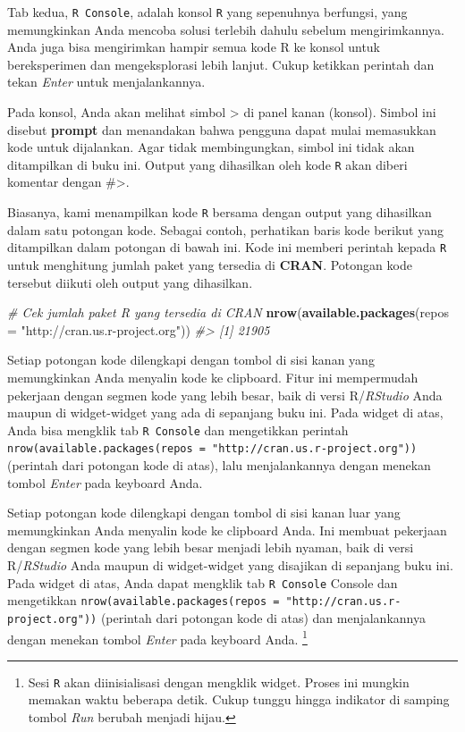 \documentclass[
  oneside]{book}
\newenvironment{Shaded}{\begin{snugshade}}{\end{snugshade}}
\newcommand{\AttributeTok}[1]{\textcolor[rgb]{0.13,0.29,0.53}{#1}}
\newcommand{\CommentTok}[1]{\textcolor[rgb]{0.56,0.35,0.01}{\textit{#1}}}
\newcommand{\FunctionTok}[1]{\textcolor[rgb]{0.13,0.29,0.53}{\textbf{#1}}}
\newcommand{\NormalTok}[1]{#1}
\newcommand{\StringTok}[1]{\textcolor[rgb]{0.31,0.60,0.02}{#1}}
\begin{document}
Tab kedua, \texttt{R Console}, adalah konsol \texttt{R} yang
sepenuhnya berfungsi, yang memungkinkan Anda mencoba solusi terlebih
dahulu sebelum mengirimkannya. Anda juga bisa mengirimkan hampir semua
kode R ke konsol untuk bereksperimen dan mengeksplorasi lebih lanjut.
Cukup ketikkan perintah dan tekan \emph{Enter} untuk menjalankannya.

Pada konsol, Anda akan melihat simbol \textgreater{} di panel kanan
(konsol). Simbol ini disebut \textbf{prompt} dan menandakan bahwa pengguna
dapat mulai memasukkan kode untuk dijalankan. Agar tidak membingungkan,
simbol ini tidak akan ditampilkan di buku ini. Output yang dihasilkan
oleh kode \texttt{R} akan diberi komentar dengan \#\textgreater{}.

Biasanya, kami menampilkan kode \texttt{R} bersama dengan output
yang dihasilkan dalam satu potongan kode. Sebagai contoh, perhatikan
baris kode berikut yang ditampilkan dalam potongan di bawah ini. Kode
ini memberi perintah kepada \texttt{R} untuk menghitung jumlah
paket yang tersedia di \textbf{CRAN}. Potongan kode tersebut diikuti oleh
output yang dihasilkan.

\begin{Shaded}
\begin{Highlighting}[]
\CommentTok{\# Cek jumlah paket R yang tersedia di CRAN}
\FunctionTok{nrow}\NormalTok{(}\FunctionTok{available.packages}\NormalTok{(}\AttributeTok{repos =} \StringTok{"http://cran.us.r{-}project.org"}\NormalTok{))}
\CommentTok{\#\textgreater{} [1] 21905}
\end{Highlighting}
\end{Shaded}

Setiap potongan kode dilengkapi dengan tombol di sisi kanan yang
memungkinkan Anda menyalin kode ke clipboard. Fitur ini mempermudah
pekerjaan dengan segmen kode yang lebih besar, baik di versi
R/\emph{RStudio} Anda maupun di widget-widget yang ada di sepanjang
buku ini. Pada widget di atas, Anda bisa mengklik tab
\texttt{R Console} dan mengetikkan perintah
\texttt{nrow(available.packages(repos\ =\ "http://cran.us.r-project.org"))}
(perintah dari potongan kode di atas), lalu menjalankannya dengan
menekan tombol \emph{Enter} pada keyboard Anda.

Setiap potongan kode dilengkapi dengan tombol di sisi kanan luar yang
memungkinkan Anda menyalin kode ke clipboard Anda. Ini membuat pekerjaan
dengan segmen kode yang lebih besar menjadi lebih nyaman, baik di versi
R/\emph{RStudio} Anda maupun di widget-widget yang disajikan di
sepanjang buku ini. Pada widget di atas, Anda dapat mengklik tab
\texttt{R Console} Console dan mengetikkan
\texttt{nrow(available.packages(repos\ =\ "http://cran.us.r-project.org"))}
(perintah dari potongan kode di atas) dan menjalankannya dengan menekan
tombol \emph{Enter} pada keyboard Anda. \footnote{Sesi \texttt{R} akan diinisialisasi dengan mengklik
  widget. Proses ini mungkin memakan waktu beberapa detik. Cukup
  tunggu hingga indikator di samping tombol \emph{Run} berubah menjadi
  hijau.}
\end{document}
